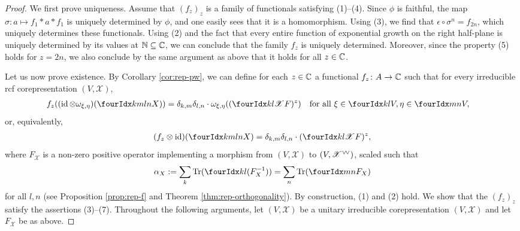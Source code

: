 \begin{proof}
  We first prove uniqueness.  Assume that $(f_{z})_{z}$ is a family of
  functionals satisfying (1)--(4).  Since $\phi$ is faithful, the map
  $\sigma\colon a \mapsto f_{1} \ast a \ast f_{1}$ is uniquely
  determined by $\phi$, and one easily sees that it is a homomorphism. Using
  (3), we find that $\epsilon \circ \sigma^n=f_{2n}$, which uniquely determines these functionals. Using (2) and the
  fact that every entire function of exponential growth on the right
  half-plane is uniquely determined by its values at $\mathbb{N} \subseteq \mathbb{C}$, we can conclude that the family $f_{z}$ is uniquely determined. Moreover, since the property (5) holds for $z = 2n$, we also conclude by the same argument as above that it holds for all $z\in \mathbb{C}$.

  Let us now prove existence.  By Corollary \ref{cor:rep-pw}, we can
  define for each $z\in \mathbb{C}$ a functional $f_{z} \colon A \to \mathbb{C}$ such
  that for every irreducible rcf corepresentation
  $(V,\mathscr{X})$,
    \begin{align*}
      f_{z}((\id \otimes \omega_{\xi,\eta})(\Gr{X}{k}{l}{m}{n})) &=
      \delta_{k,m}\delta_{l,n} \cdot
      \omega_{\xi,\eta}((\Gr{F}{k}{l}{}{\mathscr{X}})^{z}) \quad \text{for all }
      \xi \in \Gru{V}{k}{l},\eta \in
      \Gru{V}{m}{n},
    \end{align*}
    or, equivalently,
    \begin{align*}
      (f_{z} \otimes \id)(\Gr{X}{k}{l}{m}{n}) =
      \delta_{k,m}\delta_{l,n} \cdot (\Gr{F}{k}{l}{}{\mathscr{X}})^{z},
    \end{align*}
    where $F_{\mathscr{X}}$ is a non-zero positive operator implementing a morphism from $(V,\mathscr{X})$ to
    $(V, \mathscr{X}^{\vee}\!{}^{\vee})$, scaled such that
    \begin{align*}
      \alpha_{X}:= \sum_{k} \Tr(\Gru{(F_{X}^{-1})}{k}{l}) = \sum_{n}
      \Tr(\Gru{F_{X}}{m}{n})
    \end{align*}
    for all $l,n$ (see Proposition \ref{prop:rep-f} and Theorem \ref{thm:rep-orthogonality}). By
    construction, (1) and (2) hold. We show that the $(f_{z})_{z}$ satisfy the
    assertions (3)--(7). 
    Throughout the following arguments, let 
    $(V,\mathscr{X})$ be a unitary irreducible corepresentation
    $(V,\mathscr{X})$ and let $F_{\mathscr{X}}$ be as above.


\end{proof}
